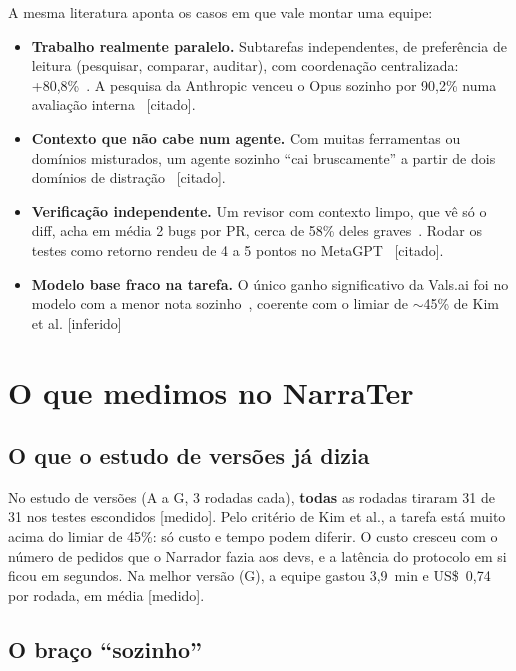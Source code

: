 \documentclass[11pt,a4paper]{article}
\newcommand{\rot}[1]{\textsf{\footnotesize[#1]}}
\begin{document}
A mesma literatura aponta os casos em que vale montar uma equipe:
\begin{itemize}
  \item \textbf{Trabalho realmente paralelo.} Subtarefas independentes, de preferência de leitura
    (pesquisar, comparar, auditar), com coordenação centralizada: +80,8\%~\cite{kim2025}. A pesquisa
    da Anthropic venceu o Opus sozinho por 90,2\% numa avaliação interna~\cite{anthropic2025} \rot{citado}.
  \item \textbf{Contexto que não cabe num agente.} Com muitas ferramentas ou domínios misturados, um
    agente sozinho ``cai bruscamente'' a partir de dois domínios de distração~\cite{langchain2025} \rot{citado}.
  \item \textbf{Verificação independente.} Um revisor com contexto limpo, que vê só o diff, acha em
    média 2 bugs por PR, cerca de 58\% deles graves~\cite{cognition2026}. Rodar os testes como retorno
    rendeu de 4 a 5 pontos no MetaGPT~\cite{metagpt2023} \rot{citado}.
  \item \textbf{Modelo base fraco na tarefa.} O único ganho significativo da Vals.ai foi no modelo com a
    menor nota sozinho~\cite{vals2026}, coerente com o limiar de ${\sim}$45\% de Kim et al. \rot{inferido}
\end{itemize}

\section{O que medimos no NarraTer}\label{sec:medido}

\subsection{O que o estudo de versões já dizia}

No estudo de versões (A a G, 3 rodadas cada), \textbf{todas} as rodadas tiraram 31 de 31 nos testes
escondidos \rot{medido}. Pelo critério de Kim et al., a tarefa está muito acima do limiar de 45\%: só
custo e tempo podem diferir. O custo cresceu com o número de pedidos que o Narrador fazia aos devs, e a
latência do protocolo em si ficou em segundos. Na melhor versão (G), a equipe gastou 3,9~min e
US\$~0,74 por rodada, em média \rot{medido}.

\subsection{O braço ``sozinho''}
\end{document}
